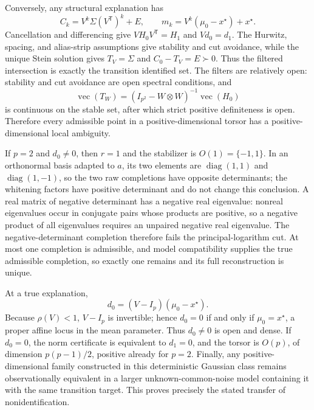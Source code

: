 Conversely, any structural explanation has
\[
 C_k=V^k\Sigma(V^{\mathsf T})^k+E,\qquad
 m_k=V^k(\mu_0-x^\star)+x^\star.
\]
Cancellation and differencing give \(VH_0V^{\mathsf T}=H_1\) and \(Vd_0=d_1\).  The Hurwitz, spacing, and alias-strip assumptions give stability and cut avoidance, while the unique Stein solution gives \(T_V=\Sigma\) and \(C_0-T_V=E\succ0\).  Thus the filtered intersection is exactly the transition identified set.  The filters are relatively open: stability and cut avoidance are open spectral conditions, and
\[
 \operatorname{vec}(T_W)=(I_{p^2}-W\otimes W)^{-1}\operatorname{vec}(H_0)
\]
is continuous on the stable set, after which strict positive definiteness is open.  Therefore every admissible point in a positive-dimensional torsor has a positive-dimensional local ambiguity.

If \(p=2\) and \(d_0\ne0\), then \(r=1\) and the stabilizer is \(O(1)=\{-1,1\}\).  In an orthonormal basis adapted to \(a\), its two elements are \(\operatorname{diag}(1,1)\) and \(\operatorname{diag}(1,-1)\), so the two raw completions have opposite determinants; the whitening factors have positive determinant and do not change this conclusion.  A real matrix of negative determinant has a negative real eigenvalue: nonreal eigenvalues occur in conjugate pairs whose products are positive, so a negative product of all eigenvalues requires an unpaired negative real eigenvalue.  The negative-determinant completion therefore fails the principal-logarithm cut.  At most one completion is admissible, and model compatibility supplies the true admissible completion, so exactly one remains and its full reconstruction is unique.

At a true explanation,
\[
 d_0=(V-I_p)(\mu_0-x^\star).
\]
Because \(\rho(V)<1\), \(V-I_p\) is invertible; hence \(d_0=0\) if and only if \(\mu_0=x^\star\), a proper affine locus in the mean parameter.  Thus \(d_0\ne0\) is open and dense.  If \(d_0=0\), the norm certificate is equivalent to \(d_1=0\), and the torsor is \(O(p)\), of dimension \(p(p-1)/2\), positive already for \(p=2\).  Finally, any positive-dimensional family constructed in this deterministic Gaussian class remains observationally equivalent in a larger unknown-common-noise model containing it with the same transition target.  This proves precisely the stated transfer of nonidentification.

